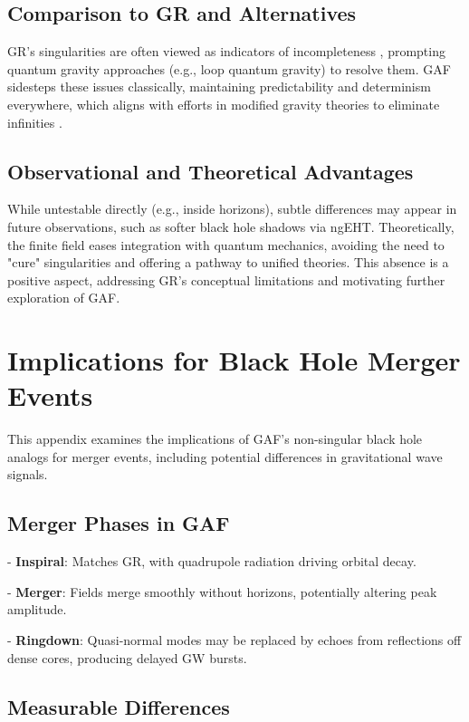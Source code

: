 \documentclass{article}
\begin{document}
\subsection{Comparison to GR and Alternatives}

GR's singularities are often viewed as indicators of incompleteness \cite{Curiel2019}, prompting quantum gravity approaches (e.g., loop quantum gravity) to resolve them. GAF sidesteps these issues classically, maintaining predictability and determinism everywhere, which aligns with efforts in modified gravity theories to eliminate infinities \cite{Wald1997}.

\subsection{Observational and Theoretical Advantages}

While untestable directly (e.g., inside horizons), subtle differences may appear in future observations, such as softer black hole shadows via ngEHT. Theoretically, the finite field eases integration with quantum mechanics, avoiding the need to "cure" singularities and offering a pathway to unified theories. This absence is a positive aspect, addressing GR's conceptual limitations and motivating further exploration of GAF.

\section{Implications for Black Hole Merger Events}

This appendix examines the implications of GAF's non-singular black hole analogs for merger events, including potential differences in gravitational wave signals.

\subsection{Merger Phases in GAF}

- \textbf{Inspiral}: Matches GR, with quadrupole radiation driving orbital decay.

- \textbf{Merger}: Fields merge smoothly without horizons, potentially altering peak amplitude.

- \textbf{Ringdown}: Quasi-normal modes may be replaced by echoes from reflections off dense cores, producing delayed GW bursts.

\subsection{Measurable Differences}
\end{document}

